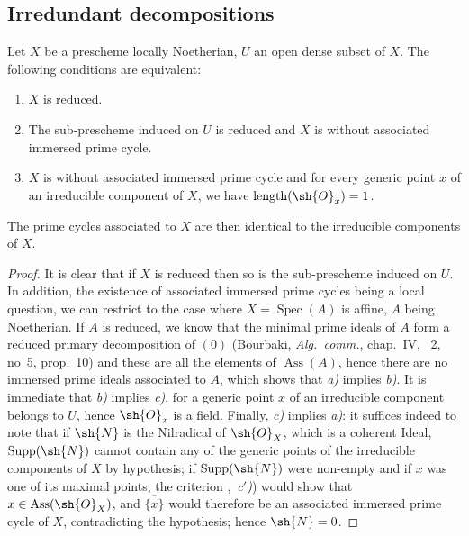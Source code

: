 
\subsection{Irredundant decompositions}
\label{subsection:IV.3.2}

\begin{proposition}[3.2.1]
\label{IV.3.2.1}
Let $X$ be a prescheme locally Noetherian, $U$ an open dense subset of $X$.
The following conditions are equivalent:
\begin{enumerate}[label=\emph{\alph*)}]
  \item $X$ is reduced.
  \item The sub-prescheme induced on $U$ is reduced and $X$ is without associated immersed prime cycle.
  \item $X$ is without associated immersed prime cycle and for every generic point $x$ of an irreducible component of $X$, we have $\operatorname{length}(\sh{O}_x)=1$.
\end{enumerate}
The prime cycles associated to $X$ are then identical to the irreducible components of $X$.
\end{proposition}

\begin{proof}
It is clear that if $X$ is reduced then so is the sub-prescheme induced on $U$.
In addition, the existence of associated immersed prime cycles being a local question, we can restrict to the case where $X=\operatorname{Spec}(A)$ is affine, $A$ being Noetherian.
If $A$ is reduced, we know that the minimal prime ideals of $A$ form a reduced primary decomposition of $(0)$ (Bourbaki, \emph{Alg.\ comm.}, chap.~IV, \textsection~2, no~5, prop.~10) and these are all the elements of $\operatorname{Ass}(A)$, hence there are no immersed prime ideals associated to $A$, which shows that \emph{a)} implies \emph{b)}.
It is immediate that \emph{b)} implies \emph{c)}, for a generic point $x$ of an irreducible component belongs to $U$, hence $\sh{O}_x$ is a field.
Finally, \emph{c)} implies \emph{a)}: it suffices indeed to note that if $\sh{N}$ is the Nilradical of $\sh{O}_X$, which is a coherent Ideal, $\operatorname{Supp}(\sh{N})$ cannot contain any of the generic points of the irreducible components of $X$ by hypothesis; if $\operatorname{Supp}(\sh{N})$ were non-empty and if $x$ was one of its maximal points, the criterion ,~\emph{c$'$)}) would show that $x\in\operatorname{Ass}(\sh{O}_X)$, and $\overline{\{x\}}$ would therefore be an associated immersed prime cycle of $X$, contradicting the hypothesis; hence $\sh{N}=0$.
\end{proof}


